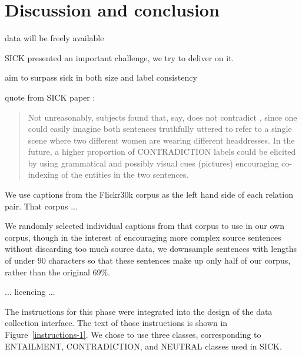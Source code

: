 \section{Discussion and conclusion}\label{sec:discussion}



data will be freely available

SICK presented an important challenge, we try to deliver on it.

aim to surpass sick in both size and label consistency

quote from SICK paper \cite{marelli2014sick}:

\begin{quote}
Not unreasonably, subjects found that, say,  does not contradict , since one could easily imagine both sentences truthfully uttered to refer to a single scene where two different women are wearing different headdresses. In the future, a higher proportion of CONTRADICTION labels could be elicited by using grammatical and possibly visual cues (pictures) encouraging co-indexing of the entities in the two sentences.
\end{quote}

We use captions from the Flickr30k corpus \cite{hodoshimage} as the left hand side of each relation pair. That corpus ...

We randomly selected individual captions from that corpus to use in our own corpus, though in the interest of encouraging more complex source sentences without discarding too much source data, we downsample sentences with lengths of under 90 characters so that these sentences make up only half of our corpus, rather than the original 69\%.

... licencing ...

The instructions for this phase were integrated into the design of the data collection interface. The text of those instructions is shown in Figure~\ref{instructions-1}. We chose to use three classes, corresponding to ENTAILMENT, CONTRADICTION, and NEUTRAL classes used in SICK.


